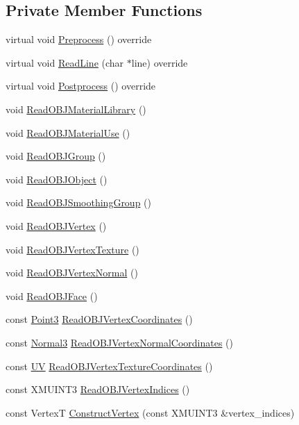 \subsection*{Private Member Functions}
\begin{DoxyCompactItemize}
\item 
virtual void \hyperlink{classmage_1_1_o_b_j_reader_ae3a3ad3b50f1dd8dffe3109fc7dc2937}{Preprocess} () override
\item 
virtual void \hyperlink{classmage_1_1_o_b_j_reader_a8d4bd7be6de3098ba899cc36e3be1283}{Read\+Line} (char $\ast$line) override
\item 
virtual void \hyperlink{classmage_1_1_o_b_j_reader_a248977c8300575ed2bab04df26197919}{Postprocess} () override
\item 
void \hyperlink{classmage_1_1_o_b_j_reader_abc1f67436e50230bd2071b2dc31a4689}{Read\+O\+B\+J\+Material\+Library} ()
\item 
void \hyperlink{classmage_1_1_o_b_j_reader_aa4c73ff0e5e3de40cacbebc189037802}{Read\+O\+B\+J\+Material\+Use} ()
\item 
void \hyperlink{classmage_1_1_o_b_j_reader_a8159620b12d426073581202fee022662}{Read\+O\+B\+J\+Group} ()
\item 
void \hyperlink{classmage_1_1_o_b_j_reader_afc3f17024a006cce3b7869ca8c6a8f07}{Read\+O\+B\+J\+Object} ()
\item 
void \hyperlink{classmage_1_1_o_b_j_reader_a2dd830c506ffbfbcd932b9bf75a35c56}{Read\+O\+B\+J\+Smoothing\+Group} ()
\item 
void \hyperlink{classmage_1_1_o_b_j_reader_a70fc61d8cc14dc8efbd73a88188cc511}{Read\+O\+B\+J\+Vertex} ()
\item 
void \hyperlink{classmage_1_1_o_b_j_reader_ae0dfedd81f23e6e15725e9ef02dd3034}{Read\+O\+B\+J\+Vertex\+Texture} ()
\item 
void \hyperlink{classmage_1_1_o_b_j_reader_aa9ef2ced0ad787b13818722c7dfa0636}{Read\+O\+B\+J\+Vertex\+Normal} ()
\item 
void \hyperlink{classmage_1_1_o_b_j_reader_a647cd7683007f351096702924ce46a3b}{Read\+O\+B\+J\+Face} ()
\item 
const \hyperlink{structmage_1_1_point3}{Point3} \hyperlink{classmage_1_1_o_b_j_reader_ace593a436953e8583b5b4cd721893c44}{Read\+O\+B\+J\+Vertex\+Coordinates} ()
\item 
const \hyperlink{structmage_1_1_normal3}{Normal3} \hyperlink{classmage_1_1_o_b_j_reader_a2be022b43cf2ad848c7a2d013b16e5f2}{Read\+O\+B\+J\+Vertex\+Normal\+Coordinates} ()
\item 
const \hyperlink{structmage_1_1_u_v}{UV} \hyperlink{classmage_1_1_o_b_j_reader_a9b1a38d60a9d1c5c9095394fa37375e6}{Read\+O\+B\+J\+Vertex\+Texture\+Coordinates} ()
\item 
const X\+M\+U\+I\+N\+T3 \hyperlink{classmage_1_1_o_b_j_reader_a2e807f8c18874135888d1e99d4d08d90}{Read\+O\+B\+J\+Vertex\+Indices} ()
\item 
const VertexT \hyperlink{classmage_1_1_o_b_j_reader_aa899d5657f913d488cc748fd49ccee60}{Construct\+Vertex} (const X\+M\+U\+I\+N\+T3 \&vertex\+\_\+indices)
\end{DoxyCompactItemize}
